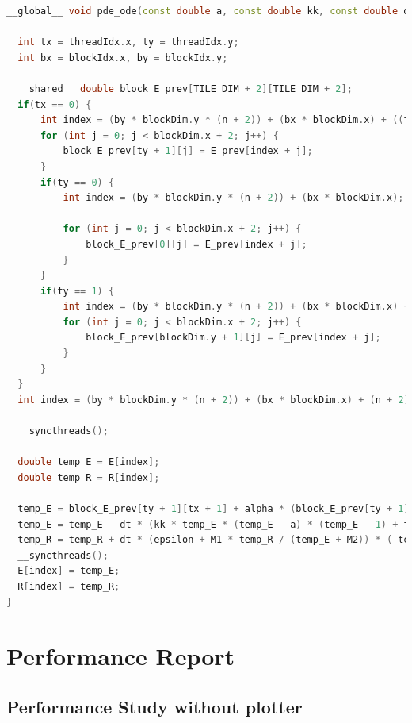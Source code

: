 \documentclass{article}
\begin{document}
\begin{lstlisting}[language=C++]
__global__ void pde_ode(const double a, const double kk, const double dt, const int n, const int m, double *E, double *E_prev, double *R, const double epsilon, const double M1, const double M2, const double b, const double alpha) {

  int tx = threadIdx.x, ty = threadIdx.y;
  int bx = blockIdx.x, by = blockIdx.y;
    
  __shared__ double block_E_prev[TILE_DIM + 2][TILE_DIM + 2];     
  if(tx == 0) {
      int index = (by * blockDim.y * (n + 2)) + (bx * blockDim.x) + ((ty + 1) * (n + 2));
      for (int j = 0; j < blockDim.x + 2; j++) {
          block_E_prev[ty + 1][j] = E_prev[index + j];
      }
      if(ty == 0) {
          int index = (by * blockDim.y * (n + 2)) + (bx * blockDim.x);
  
          for (int j = 0; j < blockDim.x + 2; j++) {
              block_E_prev[0][j] = E_prev[index + j];
          }
      }
      if(ty == 1) {
          int index = (by * blockDim.y * (n + 2)) + (bx * blockDim.x) + ((blockDim.y + 1) * (n + 2));
          for (int j = 0; j < blockDim.x + 2; j++) {
              block_E_prev[blockDim.y + 1][j] = E_prev[index + j];
          }
      }
  }  
  int index = (by * blockDim.y * (n + 2)) + (bx * blockDim.x) + (n + 2) + 1 + (ty * (n + 2) + tx);
  
  __syncthreads();

  double temp_E = E[index]; 
  double temp_R = R[index];
   
  temp_E = block_E_prev[ty + 1][tx + 1] + alpha * (block_E_prev[ty + 1][tx + 2] + block_E_prev[ty + 1][tx] - 4 * block_E_prev[ty + 1][tx + 1] + block_E_prev[ty + 2][tx + 1] + block_E_prev[ty][tx + 1]);
  temp_E = temp_E - dt * (kk * temp_E * (temp_E - a) * (temp_E - 1) + temp_E * temp_R);
  temp_R = temp_R + dt * (epsilon + M1 * temp_R / (temp_E + M2)) * (-temp_R - kk * temp_E * (temp_E - b - 1));
  __syncthreads();
  E[index] = temp_E;
  R[index] = temp_R;
}
\end{lstlisting}


\newpage

\section{Performance Report}
\subsection{Performance Study without plotter}
\end{document}
